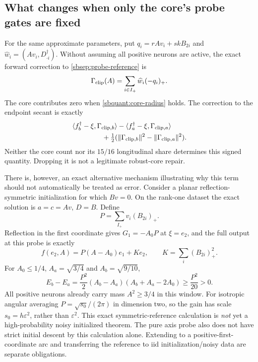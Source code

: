 \documentclass{article} %
\theoremstyle{plain}
\theoremstyle{definition}
\theoremstyle{remark}
\begin{document}
\subsection{What changes when only the core's probe gates are fixed}

For the same approximate parameters, put
$q_i=rAv_i+skB_{2i}$ and $\widehat w_i=(Av_i,D^\dagger_{\cdot i})$.
Without assuming all positive neurons are active, the exact forward
correction to \eqref{sbsep:probe-reference} is
\begin{equation}\label{sbquant:clipping-correction}
 \Gamma_{\rm clip}(A)=\sum_{i\in I_+}\widehat w_i(-q_i)_+.
\end{equation}
The core contributes zero when \eqref{sbquant:core-radius} holds.
The correction to the endpoint secant is exactly
\begin{align}\label{sbquant:clipping-secant}
 &\langle f_b^\dagger-\xi,\Gamma_{{\rm clip},b}\rangle
 -\langle f_a^\dagger-\xi,\Gamma_{{\rm clip},a}\rangle\\
 &\hspace{15mm}
 +\tfrac12(\|\Gamma_{{\rm clip},b}\|^2-
                    \|\Gamma_{{\rm clip},a}\|^2).\nonumber
\end{align}
Neither the core count nor its $15/16$ longitudinal share determines this
signed quantity. Dropping it is not a legitimate robust-core repair.

There is, however, an exact alternative mechanism illustrating why this
term should not automatically be treated as error. Consider a planar
reflection-symmetric initialization for which $Bv=0$. On the rank-one
dataset the exact solution is $a=c=Av$, $D=B$. Define
\[
 P=\sum_{I_+}v_i(B_{2i})_+.
\]
Reflection in the first coordinate gives $G_1=-A_0P$ at $\xi=e_2$,
and the full output at this probe is exactly
\begin{equation}\label{sbquant:coherent-output}
 f(e_2,A)=P(A-A_0)e_1+K e_2,
 \qquad K=\sum_i(B_{2i})_+^2.
\end{equation}
For $A_0\le1/4$, $A_a=\sqrt{3/4}$ and $A_b=\sqrt{9/10}$,
\begin{equation}\label{sbquant:coherent-rebound}
 E_b-E_a
 =\frac{P^2}{2}(A_b-A_a)(A_b+A_a-2A_0)
 \ge\frac{P^2}{20}>0.
\end{equation}
All positive neurons already carry mass $A^2\ge3/4$ in this window.
For isotropic angular averaging $P=\sqrt{s_0}/(2\pi)$ in dimension two,
so the gain has scale $s_0=h\varepsilon^2$, rather than $\varepsilon^2$.
This exact symmetric-reference calculation is \emph{not} yet a
high-probability noisy initialized theorem. The pure axis probe also
does not have strict initial descent by this calculation alone. Extending
to a positive-first-coordinate arc and transferring the reference to iid
initialization/noisy data are separate obligations.
\end{document}
